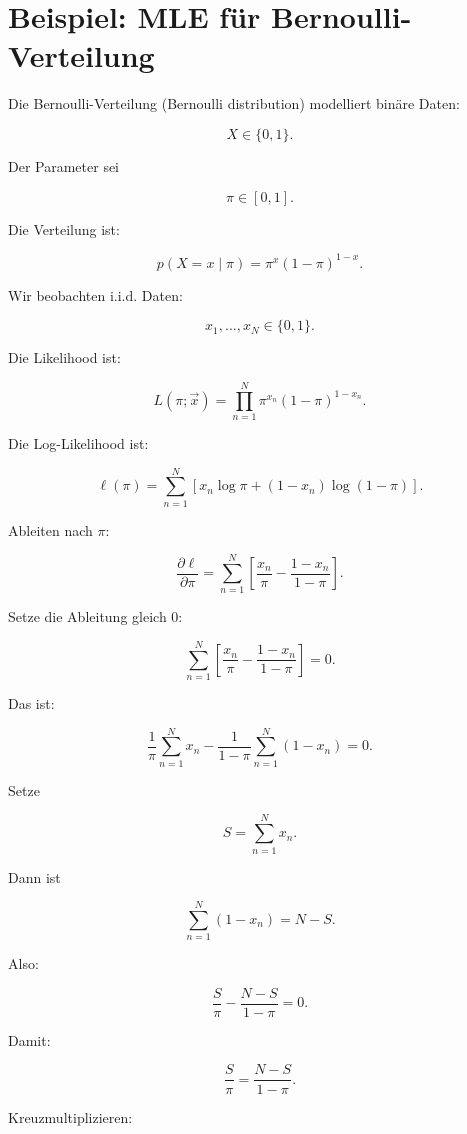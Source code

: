 \section{Beispiel: MLE für Bernoulli-Verteilung}

Die Bernoulli-Verteilung (Bernoulli distribution) modelliert binäre Daten:

\[
    X \in \{0,1\}.
\]

Der Parameter sei

\[
    \pi \in [0,1].
\]

Die Verteilung ist:

\[
    p(X=x \mid \pi)
    =
    \pi^x(1-\pi)^{1-x}.
\]

Wir beobachten i.i.d. Daten:

\[
    x_1,\dots,x_N
    \in
    \{0,1\}.
\]

Die Likelihood ist:

\[
    L(\pi;\vec{x})
    =
    \prod_{n=1}^{N}
    \pi^{x_n}
    (1-\pi)^{1-x_n}.
\]

Die Log-Likelihood ist:

\[
    \ell(\pi)
    =
    \sum_{n=1}^{N}
    \left[
        x_n \log \pi
        +
        (1-x_n)\log(1-\pi)
    \right].
\]

Ableiten nach \(\pi\):

\[
    \frac{\partial \ell}{\partial \pi}
    =
    \sum_{n=1}^{N}
    \left[
        \frac{x_n}{\pi}
        -
        \frac{1-x_n}{1-\pi}
    \right].
\]

Setze die Ableitung gleich \(0\):

\[
    \sum_{n=1}^{N}
    \left[
        \frac{x_n}{\pi}
        -
        \frac{1-x_n}{1-\pi}
    \right]
    =
    0.
\]

Das ist:

\[
    \frac{1}{\pi}
    \sum_{n=1}^{N}
    x_n
    -
    \frac{1}{1-\pi}
    \sum_{n=1}^{N}
    (1-x_n)
    =
    0.
\]

Setze

\[
    S
    =
    \sum_{n=1}^{N}
    x_n.
\]

Dann ist

\[
    \sum_{n=1}^{N}
    (1-x_n)
    =
    N-S.
\]

Also:

\[
    \frac{S}{\pi}
    -
    \frac{N-S}{1-\pi}
    =
    0.
\]

Damit:

\[
    \frac{S}{\pi}
    =
    \frac{N-S}{1-\pi}.
\]

Kreuzmultiplizieren:

